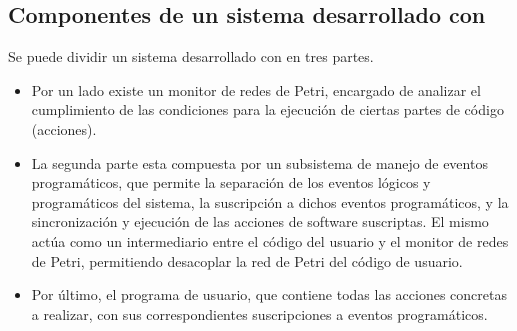   
\subsection{Componentes de un sistema desarrollado con \nombreFramework}
Se puede dividir un sistema desarrollado con \nombreFramework en tres partes.
\begin{itemize}
\item Por un lado existe un monitor de redes de Petri, encargado de analizar el
cumplimiento de las condiciones para la ejecución de ciertas partes de código
(acciones). 
\item La segunda parte esta compuesta por un subsistema de manejo de eventos
programáticos, que permite la separación de los eventos lógicos y programáticos
del sistema, la suscripción a dichos eventos programáticos, y la sincronización
y ejecución de las acciones de software suscriptas. El mismo actúa como un
intermediario entre el código del usuario y el monitor de redes de Petri,
permitiendo desacoplar la red de Petri del código de usuario. 
\item Por último, el programa de usuario, que contiene todas las acciones
concretas a realizar, con sus correspondientes suscripciones a eventos
programáticos.
\end{itemize}
  
  
 
